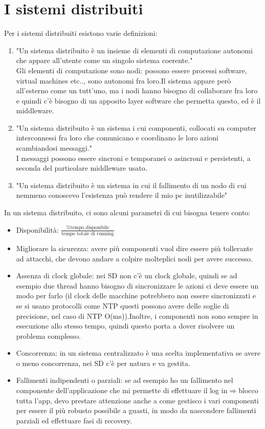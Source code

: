 \documentclass[16px]{article}
\begin{document}
\section{I sistemi distribuiti}
Per i sistemi distribuiti esistono varie definizioni:
\begin{enumerate}
\item "Un sistema distribuito è un insieme di elementi di computazione autonomi che appare all'utente come un singolo sistema coerente."\\Gli elementi di computazione sono nodi: possono essere processi software, virtual machines etc.., sono autonomi fra loro.Il sistema appare però all'esterno come un tutt'uno, ma i nodi hanno bisogno di collaborare fra loro e quindi c'è bisogno di un apposito layer software che permetta questo, ed è il middleware.
\item "Un sistema distribuito è un sistema i cui componenti, collocati su computer interconnessi fra loro che comunicano e coordinano le loro azioni scambiandosi messaggi."\\I messaggi possono essere sincroni e temporanei o asincroni e persistenti, a seconda del particolare middleware usato.
\item "Un sistema distribuito è un sistema in cui il fallimento di un nodo di cui nemmeno conoscevo l'esistenza può rendere il mio pc inutilizzabile"
\end{enumerate}
In un sistema distribuito, ci sono alcuni parametri di cui bisogna tenere conto:
\begin{itemize}
\item Disponibilità: $\frac{\% \text{tempo disponibile}}{\text{tempo totale di running}}$
\item Migliorare la sicurezza: avere più componenti vuol dire essere più tollerante ad attacchi, che devono andare a colpire molteplici nodi per avere successo.
\item Assenza di clock globale: nei SD non c'è un clock globale, quindi se ad esempio due thread hanno bisogno di sincronizzare le azioni ci deve essere un modo per farlo (il clock delle macchine potrebbero non essere sincronizzati e se si usano protocolli come NTP questi possono avere delle soglie di precisione, nel caso di NTP O(ms)).Inoltre, i componenti non sono sempre in esecuzione allo stesso tempo, quindi questo porta a dover risolvere un problema complesso.
\item Concorrenza: in un sistema centralizzato è una scelta implementativa se avere o meno concorrenza, nei SD c'è per natura e va gestita.
\item Fallimenti indipendenti o parziali: se ad esempio ho un fallimento nel componente dell'applicazione che mi permette di effettuare il log in$\Rightarrow$blocco tutta l'app, devo prestare attenzione anche a come gestisco i vari componenti per essere il più robusto possibile a guasti, in modo da nascondere fallimenti parziali ed effettuare fasi di recovery.
\end{itemize} 
\end{document}
